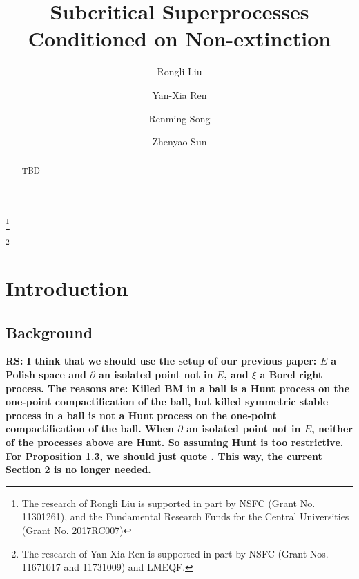 \documentclass[12pt,a4paper]{amsart}
\numberwithin{equation}{section}
\theoremstyle{plain}
\theoremstyle{definition}
\theoremstyle{remark}
\begin{document}
\title {Subcritical Superprocesses Conditioned on Non-extinction}
\author[R. Liu]{Rongli Liu}
\address{Rongli Liu\\ Mathematics and Applied Mathematics\\ Beijing jiaotong University\\ Beijing 100044\\ P. R. China}
\thanks{The research of Rongli Liu is supported in part by NSFC (Grant No. 11301261), and the Fundamental Research Funds for the Central Universities (Grant No.  2017RC007)}
\author[Y.-X. Ren]{Yan-Xia Ren}
\address{Yan-Xia Ren\\ LMAM School of Mathematical Sciences \& Center for
Statistical Science\\ Peking University\\ Beijing 100871\\ P. R. China}
\thanks{The research of Yan-Xia Ren is supported in part by NSFC (Grant Nos. 11671017 and 11731009)  and LMEQF.}
\author[R. Song]{Renming Song}
\address{Renming Song\\ Department of Mathematics\\ University of Illinois at Urbana-Champaign \\ Urbana \\ IL 61801\\ USA}
\author[Z. Sun]{Zhenyao Sun}
\address{Zhenyao Sun\\ Faculty of Industrial Engineering and Management \\ Technion, Isreal Institute of Technology \\ Haifa 3200003\\ Isreal}
\begin{abstract}
    TBD
\end{abstract}
\maketitle
\section{Introduction}
\subsection{Background}
{\bf RS: I think that we should use the setup of our previous paper: $E$ a Polish space and $\partial$ an isolated point not in $E$, and $\xi$ a Borel right process.
The reasons are: Killed BM in a ball is a Hunt process on the one-point compactification of the ball, but killed symmetric stable process in a ball is not a 
Hunt process on the one-point compactification of the ball. When $\partial$ an isolated point not in $E$, neither of the processes above are Hunt. So assuming Hunt
is too restrictive. For Proposition 1.3, we should just quote \cite[Theorem (62.19)]{Sharpe}. This way, the current Section 2 is no longer needed.}
\end{document}

